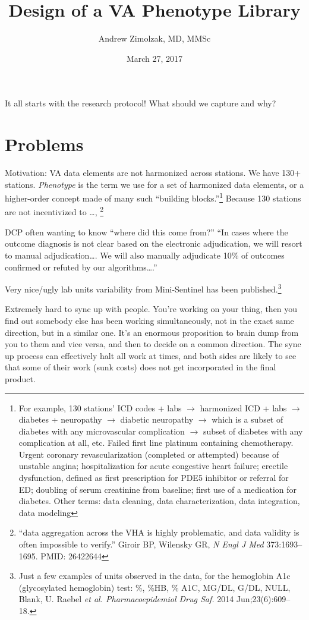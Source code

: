 \documentclass{tufte-handout}
\title{Design of a VA Phenotype Library}
\author{Andrew Zimolzak, MD, MMSc}
\date{March 27, 2017}
\begin{document}
\maketitle

It all starts with the research protocol! What should we capture and
why?

\section{Problems}

Motivation: VA data elements are not harmonized across stations. We
have 130+ stations. \emph{Phenotype} is the term we use for a set of
harmonized data elements, or a higher-order concept made of many such
``building blocks.''\footnote{For example, 130 stations' ICD codes +
  labs $\to$ harmonized ICD + labs $\to$ diabetes + neuropathy $\to$
  diabetic neuropathy $\to$ which is a subset of diabetes with any
  microvascular complication $\to$ subset of diabetes with any
  complication at all, etc. Failed first line platinum containing
  chemotherapy. Urgent coronary revascularization (completed or
  attempted) because of unstable angina; hospitalization for acute
  congestive heart failure; erectile dysfunction, defined as first
  prescription for PDE5 inhibitor or referral for ED; doubling of
  serum creatinine from baseline; first use of a medication for
  diabetes. Other terms: data cleaning, data characterization, data
  integration, data modeling} Because 130 stations are not
incentivized to \ldots{}, %
\footnote{``data aggregation across the
VHA is highly problematic, and data validity is often impossible to
verify.'' Giroir BP, Wilensky GR, \emph{N Engl J Med}
  373:1693--1695. PMID: 26422644}

DCP often wanting
to know ``where did this come from?''  ``In cases where the outcome
diagnosis is not clear based on the electronic adjudication, we will
resort to manual adjudication\ldots{}. We will also manually adjudicate
10\% of outcomes confirmed or refuted by our algorithms\ldots{}.''

Very nice/ugly lab units variability from Mini-Sentinel has been
published.\footnote{Just a few examples of units observed in the data,
  for the hemoglobin A1c (glycosylated hemoglobin) test: \%, \%HB, \%
  A1C, MG/DL, G/DL, NULL, Blank, U. Raebel \emph{et al.
    Pharmacoepidemiol Drug Saf.} 2014 Jun;23(6):609--18.}

Extremely hard to sync up with people. You're working on your thing,
then you find out somebody else has been working simultaneously, not
in the exact same direction, but in a similar one. It's an enormous
proposition to brain dump from you to them and vice versa, and then to
decide on a common direction. The sync up process can effectively halt
all work at times, and both sides are likely to see that some of their
work (sunk costs) does not get incorporated in the final product.
\end{document}
